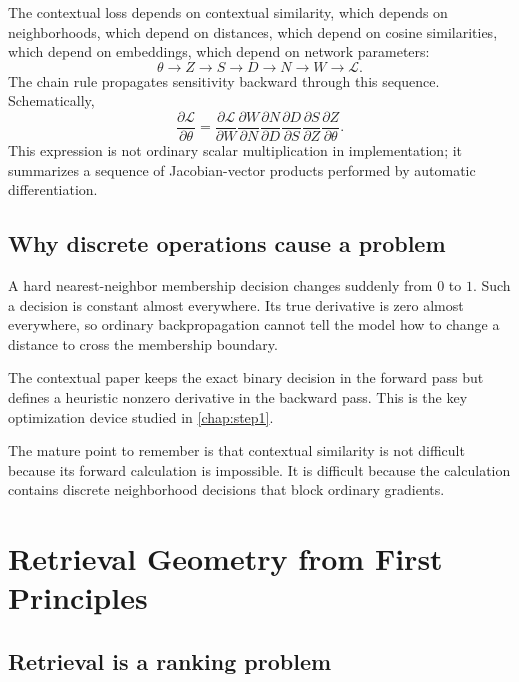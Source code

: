 \documentclass[11pt,oneside,openany]{book}
\theoremstyle{myplain}
\theoremstyle{definition}
\begin{document}
The contextual loss depends on contextual similarity, which depends on neighborhoods, which depend on distances, which depend on cosine similarities, which depend on embeddings, which depend on network parameters:
\[
\theta
\longrightarrow Z
\longrightarrow S
\longrightarrow D
\longrightarrow N
\longrightarrow W
\longrightarrow\mathcal L.
\]
The chain rule propagates sensitivity backward through this sequence. Schematically,
\[
\frac{\partial\mathcal L}{\partial\theta}
=
\frac{\partial\mathcal L}{\partial W}
\frac{\partial W}{\partial N}
\frac{\partial N}{\partial D}
\frac{\partial D}{\partial S}
\frac{\partial S}{\partial Z}
\frac{\partial Z}{\partial\theta}.
\]
This expression is not ordinary scalar multiplication in implementation; it summarizes a sequence of Jacobian-vector products performed by automatic differentiation.

\section{Why discrete operations cause a problem}

A hard nearest-neighbor membership decision changes suddenly from $0$ to $1$. Such a decision is constant almost everywhere. Its true derivative is zero almost everywhere, so ordinary backpropagation cannot tell the model how to change a distance to cross the membership boundary.

The contextual paper keeps the exact binary decision in the forward pass but defines a heuristic nonzero derivative in the backward pass. This is the key optimization device studied in \cref{chap:step1}.

\begin{meetingbox}[title=Checkpoint]
The mature point to remember is that contextual similarity is not difficult because its forward calculation is impossible. It is difficult because the calculation contains discrete neighborhood decisions that block ordinary gradients.
\end{meetingbox}


\chapter{Retrieval Geometry from First Principles}
\label{chap:geometry}

\section{Retrieval is a ranking problem}
\end{document}
